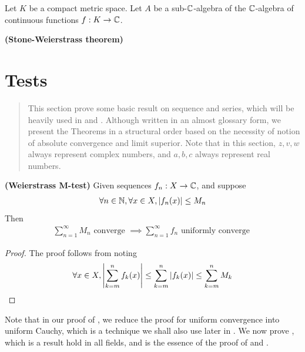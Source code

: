 \documentclass{report}
\begin{document}
Let $K$ be a compact metric space. Let $A$ be a sub-$\mathbb{C}$-algebra of the $\mathbb{C}$-algebra of continuous functions $f:K\rightarrow \mathbb{C}$. 
\begin{theorem}
\textbf{(Stone-Weierstrass theorem)} 
\end{theorem}
\section{Tests}
\label{Basic Technique on Sequence and Series}
\begin{abstract}
This section prove some basic result on sequence and series, which will be heavily used in  and . Although written in an almost glossary form, we present the Theorems in a structural order based on the necessity of notion of absolute convergence and limit superior. Note that in this section, $z,v,w$ always represent complex numbers, and $a,b,c$ always represent real numbers.  
\end{abstract}
\begin{theorem}
\label{WM-t}
\textbf{(Weierstrass M-test)} Given sequences $f_n:X\rightarrow \mathbb{C}$, and suppose 
\begin{align*}
\forall n\in\mathbb{N},\forall x\in X, \left|f_n(x)\right|\leq M_n
\end{align*}
Then 
\begin{align*}
\sum_{n=1}^\infty M_n\text{ converge }\implies \sum_{n=1}^\infty f_n\text{ uniformly converge }
\end{align*} 
\end{theorem}
\begin{proof}
The proof follows from noting 
\begin{align*}
  \forall x\in X, \left|\sum_{k=m}^n f_k(x)\right|\leq \sum_{k=m}^n \left|f_k(x)\right|\leq \sum_{k=m}^n M_k
\end{align*}
\end{proof}
\begin{mdframed}
  Note that in our proof of  , we reduce the proof for uniform convergence into uniform Cauchy, which is a technique we shall also use later in . We now prove , which is a result hold in all fields, and is the essence of the proof of  and . 
\end{mdframed}
\end{document}
